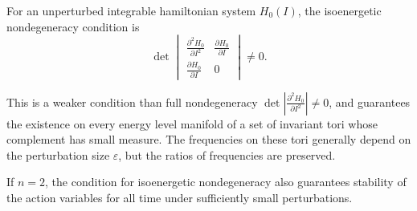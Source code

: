 For an unperturbed integrable hamiltonian system $H_0(I)$, the isoenergetic nondegeneracy condition is
$$\det \begin{vmatrix}
\frac{\partial^2 H_0}{\partial I^2} & \frac{\partial H_0}{\partial I} \\[4pt]
\frac{\partial H_0}{\partial I} & 0
\end{vmatrix} \neq 0.$$

This is a weaker condition than full nondegeneracy $\det |\frac{\partial^2 H_0}{\partial I^2}| \neq 0$, and guarantees the existence on every energy level manifold of a set of invariant tori whose complement has small measure. The frequencies on these tori generally depend on the perturbation size $\varepsilon$, but the ratios of frequencies are preserved.

If $n = 2$, the condition for isoenergetic nondegeneracy also guarantees stability of the action variables for all time under sufficiently small perturbations.
